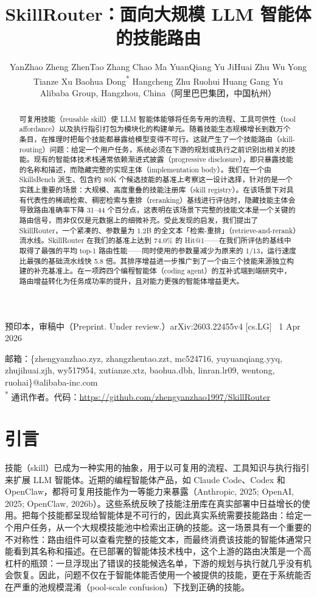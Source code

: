 \documentclass[11pt,UTF8,fontset=fandol]{ctexart}
\title{\textbf{SkillRouter：面向大规模 LLM 智能体的技能路由}}
\author{YanZhao Zheng \quad ZhenTao Zhang \quad Chao Ma \quad YuanQiang Yu \quad JiHuai Zhu \quad Wu Yong \\
Tianze Xu \quad Baohua Dong\textsuperscript{*} \quad Hangcheng Zhu \quad Ruohui Huang \quad Gang Yu \\[0.4em]
\normalsize Alibaba Group, Hangzhou, China（阿里巴巴集团，中国杭州）}
\date{}
\makeatletter
\newcommand{\Hit}{Hit@1}
\makeatother
\begin{document}
\maketitle

\begin{center}
\small 预印本，审稿中（Preprint. Under review.）\quad arXiv:2603.22455v4 [cs.LG] \ 1 Apr 2026
\end{center}

\vspace{-0.6em}
\noindent\footnotesize
邮箱：\{zhengyanzhao.zyz, zhangzhentao.zzt, mc524716, yuyuanqiang.yyq, zhujihuai.zjh, wy517954, xutianze.xtz, baohua.dbh, linran.lr09, wentong, ruohai\}@alibaba-inc.com\\
\textsuperscript{*} 通讯作者。\quad 代码：\url{https://github.com/zhengyanzhao1997/SkillRouter}
\normalsize

\begin{abstract}
可复用技能（reusable skill）使 LLM 智能体能够将任务专用的流程、工具可供性（tool affordance）以及执行指引打包为模块化的构建单元。随着技能生态规模增长到数万个条目，在推理时把每个技能都暴露给模型变得不可行。这就产生了一个技能路由（skill-routing）问题：给定一个用户任务，系统必须在下游的规划或执行之前识别出相关的技能。现有的智能体技术栈通常依赖渐进式披露（progressive disclosure），即只暴露技能的名称和描述，而隐藏完整的实现主体（implementation body）。我们在一个由 SkillsBench 派生、包含约 80K 个候选技能的基准上考察这一设计选择，针对的是一个实践上重要的场景：大规模、高度重叠的技能注册库（skill registry）。在该场景下对具有代表性的稀疏检索、稠密检索与重排（reranking）基线进行评估时，隐藏技能主体会导致路由准确率下降 31--44 个百分点，这表明在该场景下完整的技能文本是一个关键的路由信号，而非仅仅是元数据上的细微补充。受此发现的启发，我们提出了 SkillRouter，一个紧凑的、参数量为 1.2B 的全文本「检索-重排」（retrieve-and-rerank）流水线。SkillRouter 在我们的基准上达到 74.0\% 的 \Hit{}——在我们所评估的基线中取得了最强的平均 top-1 路由性能——同时使用的参数量减少为原来的 1/13，运行速度比最强的基础流水线快 5.8 倍。其排序增益进一步推广到了一个由三个技能来源独立构建的补充基准上。在一项跨四个编程智能体（coding agent）的互补式端到端研究中，路由增益转化为任务成功率的提升，且对能力更强的智能体增益更大。
\end{abstract}

\section{引言}

技能（skill）已成为一种实用的抽象，用于以可复用的流程、工具知识与执行指引来扩展 LLM 智能体。近期的编程智能体产品，如 Claude Code、Codex 和 OpenClaw，都将可复用技能作为一等能力来暴露（Anthropic, 2025; OpenAI, 2025; OpenClaw, 2026b）。这些系统反映了技能注册库在真实部署中日益增长的使用。把每个技能都呈现给智能体是不可行的，因此真实系统需要技能路由：给定一个用户任务，从一个大规模技能池中检索出正确的技能。这一场景具有一个重要的不对称性：路由组件可以查看完整的技能文本，而最终消费该技能的智能体通常只能看到其名称和描述。在已部署的智能体技术栈中，这个上游的路由决策是一个高杠杆的瓶颈：一旦浮现出了错误的技能候选名单，下游的规划与执行就几乎没有机会恢复。因此，问题不仅在于智能体能否使用一个被提供的技能，更在于系统能否在严重的池规模混淆（pool-scale confusion）下找到正确的技能。
\end{document}
